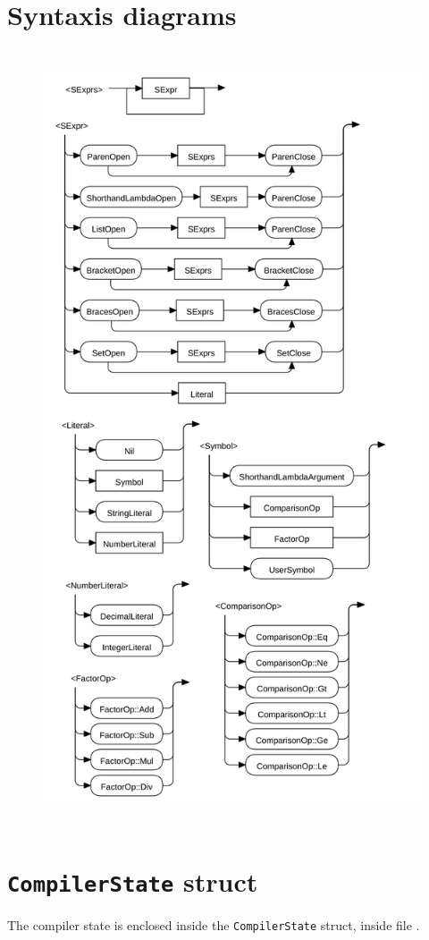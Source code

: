 \documentclass[11pt]{scrreprt}
\begin{document}
\section{Syntaxis diagrams}
\begin{figure}[H]
  \centering
  \includegraphics[height=650pt]{SyntaxisDiagrams.png}
\end{figure}


\section{\texttt{CompilerState} struct}
The compiler state is enclosed inside the \texttt{CompilerState} struct, inside file .
\end{document}
